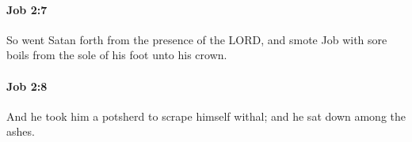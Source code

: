 		\paragraph{Job 2:7} %
			\label{JOB-2-7}

			So went Satan forth from the presence of the LORD, and smote Job with sore boils from the sole of his foot unto his crown.


		\paragraph{Job 2:8} %
			\label{JOB-2-8}

			And he took him a potsherd to scrape himself withal; and he sat down among the ashes.


